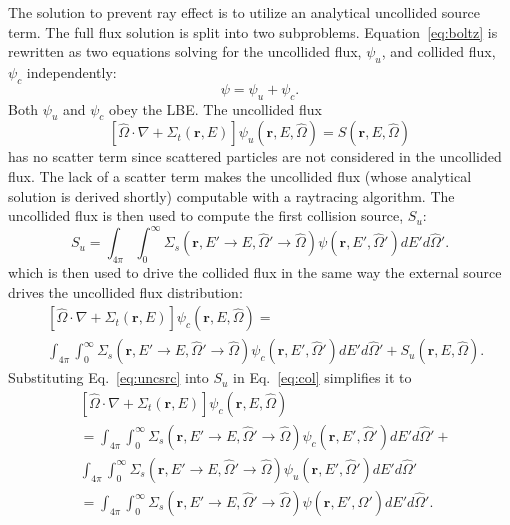 The solution to prevent ray effect is to utilize an analytical uncollided source term. The full flux solution is split into two subproblems.
Equation~\ref{eq:boltz} is rewritten as two equations solving for the uncollided flux, $\psi_u$, and collided flux, $\psi_c$ independently:
\begin{equation} \label{eq:totflux}
\psi = \psi_u + \psi_c.
\end{equation}
Both $\psi_u$ and $\psi_c$ obey the LBE. The uncollided flux 
\begin{equation} \label{eq:unc}
\left[ \hat{\Omega} \cdot \nabla + \Sigma_t(\boldsymbol{r}, E) \right]
\psi_u(\boldsymbol{r}, E, \hat{\Omega}) =  S(\boldsymbol{r}, E, \hat{\Omega})
\end{equation}
has no scatter term since scattered particles are not considered in the uncollided flux. The lack of a scatter term makes the uncollided flux (whose analytical solution is derived shortly) computable with a raytracing algorithm. The uncollided flux is then used to compute the first collision source, $S_u$:
\begin{equation}\label{eq:uncsrc}
S_u = \int_{4\pi}^{} \int_{0}^{\infty} \Sigma_s(\boldsymbol{r}, E' \rightarrow E, \hat{\Omega}' \rightarrow \hat{\Omega}) \psi(\boldsymbol{r}, E', \hat{\Omega}') dE' d\hat{\Omega}'.
\end{equation}
which is then used to drive the collided flux in the same way the external source drives the uncollided flux distribution:
\begin{equation} \label{eq:col}
\begin{split}
	&\left[ \hat{\Omega} \cdot \nabla + \Sigma_t(\boldsymbol{r}, E) \right]
	\psi_c(\boldsymbol{r}, E, \hat{\Omega}) = \\
	&\int_{4 \pi} \int_0^\infty \Sigma_s(\boldsymbol{r}, E' \rightarrow E, \hat{\Omega}' \rightarrow \hat{\Omega}) \psi_c(\boldsymbol{r}, E', \hat{\Omega}') dE' d\hat{\Omega}' + S_{u}(\boldsymbol{r}, E, \hat{\Omega}).
\end{split}
\end{equation}
Substituting Eq.~\ref{eq:uncsrc} into $S_u$ in Eq.~\ref{eq:col} simplifies it to
\begin{equation} \label{eq:col2}
\begin{split}
	&\left[ \hat{\Omega} \cdot \nabla + \Sigma_t(\boldsymbol{r}, E) \right]
	\psi_c(\boldsymbol{r}, E, \hat{\Omega}) \\
	&=
	\int_{4 \pi} \int_0^\infty \Sigma_s(\boldsymbol{r}, E' \rightarrow E, \hat{\Omega}' \rightarrow \hat{\Omega}) \psi_c(\boldsymbol{r}, E', \hat{\Omega}') dE' d\hat{\Omega}' + \\
	&\int_{4\pi} \int_{0}^{\infty} 
\Sigma_s(\boldsymbol{r}, E' \rightarrow E, \hat{\Omega}' \rightarrow \hat{\Omega}) \psi_u(\boldsymbol{r}, E', \hat{\Omega}') 
dE' d\hat{\Omega}' \\
& = \int_{4 \pi} \int_{0}^{\infty} \Sigma_s(\boldsymbol{r}, E' \rightarrow E, \hat{\Omega}' \rightarrow \hat{\Omega}) \psi(\boldsymbol{r}, E', \hat{\Omega}') dE' d\hat{\Omega}'.
\end{split}
\end{equation}


